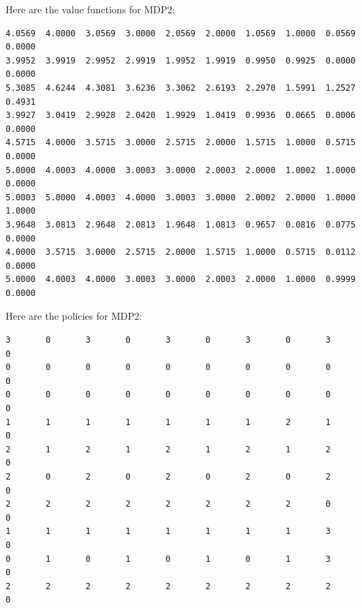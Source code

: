 \documentclass[paper=a4, fontsize=11pt]{scrartcl}
\begin{document}
Here are the value functions for MDP2:

\begin{verbatim}
4.0569  4.0000  3.0569  3.0000  2.0569  2.0000  1.0569  1.0000  0.0569  0.0000
3.9952  3.9919  2.9952  2.9919  1.9952  1.9919  0.9950  0.9925  0.0000  0.0000
5.3085  4.6244  4.3081  3.6236  3.3062  2.6193  2.2970  1.5991  1.2527  0.4931
3.9927  3.0419  2.9928  2.0420  1.9929  1.0419  0.9936  0.0665  0.0006  0.0000
4.5715  4.0000  3.5715  3.0000  2.5715  2.0000  1.5715  1.0000  0.5715  0.0000
5.0000  4.0003  4.0000  3.0003  3.0000  2.0003  2.0000  1.0002  1.0000  0.0000
5.0003  5.0000  4.0003  4.0000  3.0003  3.0000  2.0002  2.0000  1.0000  1.0000
3.9648  3.0813  2.9648  2.0813  1.9648  1.0813  0.9657  0.0816  0.0775  0.0000
4.0000  3.5715  3.0000  2.5715  2.0000  1.5715  1.0000  0.5715  0.0112  0.0000
5.0000  4.0003  4.0000  3.0003  3.0000  2.0003  2.0000  1.0000  0.9999  0.0000
\end{verbatim}

Here are the policies for MDP2:

\begin{verbatim}
3       0       3       0       3       0       3       0       3       0
0       0       0       0       0       0       0       0       0       0
0       0       0       0       0       0       0       0       0       0
1       1       1       1       1       1       1       2       1       0
2       1       2       1       2       1       2       1       2       0
2       0       2       0       2       0       2       0       2       0
2       2       2       2       2       2       2       2       0       0
1       1       1       1       1       1       1       1       3       0
0       1       0       1       0       1       0       1       3       0
2       2       2       2       2       2       2       2       2       0
\end{verbatim}
\end{document}
